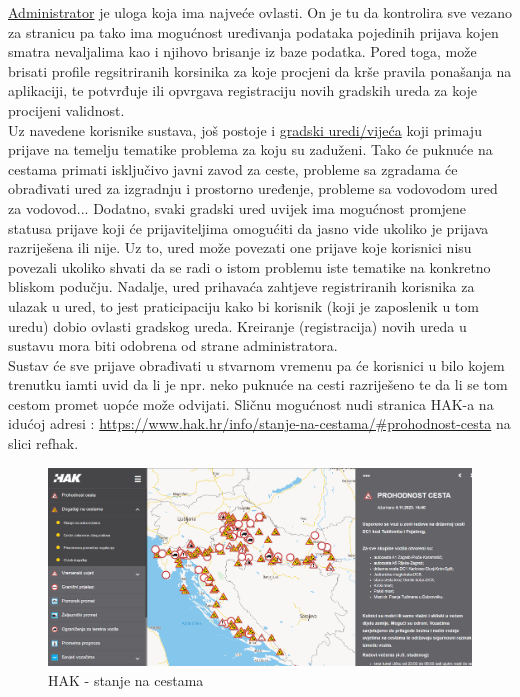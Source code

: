 		\underline{Administrator} je uloga koja ima najveće ovlasti. On je tu da kontrolira sve vezano za stranicu pa tako ima mogućnost uređivanja podataka pojedinih prijava kojen smatra nevaljalima kao i njihovo brisanje iz baze podatka. Pored toga, može brisati profile regsitriranih korsinika za koje procjeni da krše pravila ponašanja na aplikaciji, te potvrđuje ili opvrgava registraciju novih gradskih ureda za koje procijeni validnost.\\
		
		Uz navedene korisnike sustava, još postoje i \underline{gradski uredi/vijeća} koji primaju prijave na temelju tematike problema za koju su zaduženi. Tako će puknuće na cestama primati isključivo javni zavod za ceste, probleme sa zgradama će obrađivati ured za izgradnju i prostorno uređenje, probleme sa vodovodom ured za vodovod...  Dodatno, svaki gradski ured uvijek ima mogućnost  promjene statusa prijave koji će prijaviteljima omogućiti da jasno vide ukoliko je prijava razriješena ili nije. Uz to, ured može povezati one prijave koje korisnici nisu povezali ukoliko shvati da se radi o istom problemu iste tematike na konkretno bliskom podučju. Nadalje, ured prihavaća zahtjeve registriranih korisnika za ulazak u ured, to jest praticipaciju kako bi korisnik (koji je zaposlenik u tom uredu) dobio ovlasti gradskog ureda. Kreiranje (registracija) novih ureda u sustavu mora biti odobrena od strane administratora.\\
		
		Sustav će sve prijave obrađivati u stvarnom vremenu pa će korisnici u bilo kojem trenutku iamti uvid da li je npr. neko puknuće na cesti razriješeno te da li se tom cestom promet uopće može odvijati. Sličnu mogućnost nudi stranica HAK-a na idućoj adresi : \url{https://www.hak.hr/info/stanje-na-cestama/#prohodnost-cesta} na slici ref{hak}.\\
		
			
			\begin{figure}[H]
			\includegraphics[scale=0.4]{slike/hak.PNG} %
			\centering
			\caption{HAK - stanje na cestama}
			\label{fig:hak}
		\end{figure}
		
